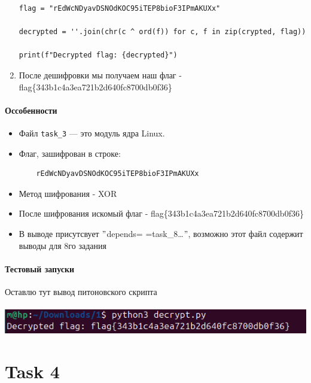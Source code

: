 \begin{enumerate}
\begin{verbatim}
flag = "rEdWcNDyavDSNOdKOC95iTEP8bioF3IPmAKUXx"

decrypted = ''.join(chr(c ^ ord(f)) for c, f in zip(crypted, flag))

print(f"Decrypted flag: {decrypted}")

        \end{verbatim}
        \item После дешифровки мы получаем наш флаг - flag\{343b1c4a3ea721b2d640fc8700db0f36\}
    \end{enumerate}

    \vspace{0.5cm}

    \noindent

    \paragraph{Оссобенности}
    \begin{itemize}
        \item Файл \texttt{task\_3} — это модуль ядра Linux.
        \item Флаг, зашифрован в строке:
        \begin{verbatim}
    rEdWcNDyavDSNOdKOC95iTEP8bioF3IPmAKUXx
        \end{verbatim}
        \item Метод шифрования - XOR
        \item После шифрования искомый флаг - flag\{343b1c4a3ea721b2d640fc8700db0f36\}
        \item В выводе присутсвует \("\)depends= \ldotsname=task\_8\ldots\("\), возможно этот файл содержит выводы для 8го задания
    \end{itemize}

    \paragraph{Тестовый запуски}
    Оставлю тут вывод питоновского скрипта

    \paragraph{}
    \includegraphics[width=1\linewidth]{static/solution_task_3.png}


    \section*{Task 4}


